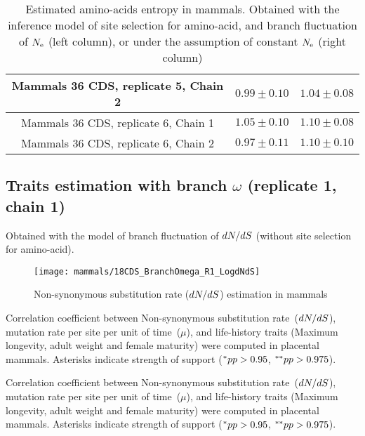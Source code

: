 \begin{table}[H]
{\begin{tabu}{|c|c|c|}
        Mammals 36 CDS, replicate 5, Chain 2 & $0.99 \pm 0.10$ & $1.04 \pm 0.08$\\ \hline
        Mammals 36 CDS, replicate 6, Chain 1 & $1.05 \pm 0.10$ & $1.10 \pm 0.08$\\ \hline
        Mammals 36 CDS, replicate 6, Chain 2 & $0.97 \pm 0.11$ & $1.10 \pm 0.10$\\ \hline
    \end{tabu}}
    \caption[Entropy of amino-acids in mammals]{Estimated amino-acids entropy in mammals.
    Obtained with the inference model of site selection for amino-acid, and branch fluctuation of $N_{\mathrm{e}}$ (left column), or under the assumption of constant $N_{\mathrm{e}}$ (right column)}
\end{table}

\subsection{Traits estimation with branch \texorpdfstring{$\omega$}{ω} (replicate 1, chain 1)}
Obtained with the model of branch fluctuation of $\dnds$ (without site selection for amino-acid).

\begin{figure}[H]
    \centering
    \texttt{[image: mammals/18CDS\_BranchOmega\_R1\_LogdNdS]}
    \caption[$\dnds$ estimation in mammals]{{Non-synonymous substitution} rate ($\dnds$) estimation in mammals}
\end{figure}

\begin{table}[H]
    
    \caption[Correlation coefficient matrix in mammals ($\dnds$)]{
    Correlation coefficient between Non-synonymous \gls{substitution} rate~($\dnds$), mutation rate per site per unit of time~($\mu$), and life-history traits (Maximum longevity, adult weight and female maturity) were computed in placental mammals.
    Asterisks indicate strength of support ($\smash{^{*}} pp > 0.95$, $\smash{^{**}} pp > 0.975$).}
\end{table}

\begin{table}[H]
    
    \caption[Covariance matrix in mammals ($\dnds$)]{
    Correlation coefficient between Non-synonymous \gls{substitution} rate~($\dnds$), mutation rate per site per unit of time~($\mu$), and life-history traits (Maximum longevity, adult weight and female maturity) were computed in placental mammals.
    Asterisks indicate strength of support ($\smash{^{*}} pp > 0.95$, $\smash{^{**}} pp > 0.975$).}
\end{table}

